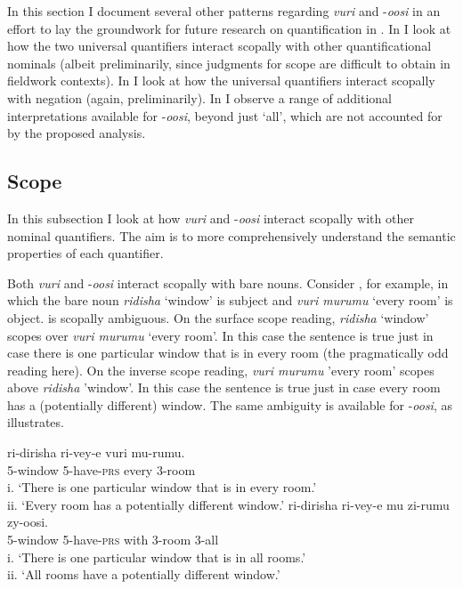 \documentclass[output=paper]{langsci/langscibook}
\begin{document}
In this section I document several other patterns regarding \textit{vuri} and -\textit{oosi} in an effort to lay the groundwork for future research on quantification in . In  I look at how the two universal quantifiers interact scopally with other quantificational nominals (albeit preliminarily, since judgments for scope are difficult to obtain in fieldwork contexts). In  I look at how the universal quantifiers interact scopally with negation (again, preliminarily). In  I observe a range of additional interpretations available for -\textit{oosi}, beyond just ‘all’, which are not accounted for by the proposed analysis.

\subsection{Scope}\label{sec:landman:4.1} 

In this subsection I look at how \textit{vuri} and -\textit{oosi} interact scopally with other nominal quantifiers. The aim is to more comprehensively understand the semantic properties of each quantifier.

Both \textit{vuri} and -\textit{oosi} interact scopally with bare nouns. Consider , for example, in which the bare noun \textit{ridisha} ‘window’ is subject and \textit{vuri murumu} ‘every room’ is object.  is scopally ambiguous. On the surface scope reading, \textit{ridisha} ‘window’ scopes over \textit{vuri murumu} ‘every room’. In this case the sentence is true just in case there is one particular window that is in every room (the pragmatically odd reading here). On the inverse scope reading, \textit{vuri murumu} 'every room' scopes above \textit{ridisha} 'window'. In this case the sentence is true just in case every room has a (potentially different) window. The same ambiguity is available for -\textit{oosi}, as  illustrates.

\ea\label{ex:landman:26} 
\ea\label{ex:landman:26a}
\gll ri-dirisha  ri-vey-e  vuri  mu-rumu.  \\
     5-window  5-have-\textsc{prs}  every  3-room\\
\glt i. ‘There is one particular window that is in every room.’  \\
ii. ‘Every room has a potentially different window.’  
\ex\label{ex:landman:26b}
\gll ri-dirisha  ri-vey-e  mu  zi-rumu  zy-oosi.\\
     5-window  5-have-\textsc{prs}  with  3-room  3-all\\
\glt i. ‘There is one particular window that is in all rooms.’ \\
ii. ‘All rooms have a potentially different window.’        
\z
\z
\end{document}
